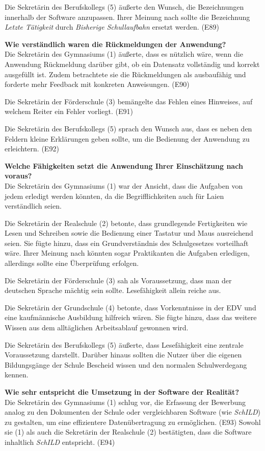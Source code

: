 Die Sekretärin des Berufskollegs (5) äußerte den Wunsch, die Bezeichnungen innerhalb der Software anzupassen. Ihrer Meinung nach sollte die Bezeichnung \textit{Letzte Tätigkeit} durch \textit{Bisherige Schullaufbahn} ersetzt werden. (E89)

\textbf{Wie verständlich waren die Rückmeldungen der Anwendung?}\\
Die Sekretärin des Gymnasiums (1) äußerte, dass es nützlich wäre, wenn die Anwendung Rückmeldung darüber gibt, ob ein Datensatz vollständig und korrekt ausgefüllt ist. Zudem betrachtete sie die Rückmeldungen als \glqq ausbaufähig\grqq{}  und forderte mehr Feedback mit konkreten Anweisungen. (E90)

Die Sekretärin der Förderschule (3) bemängelte das Fehlen eines Hinweises, auf welchem Reiter ein Fehler vorliegt. (E91)

Die Sekretärin des Berufskollegs (5) sprach den Wunsch aus, dass es neben den Feldern kleine Erklärungen geben sollte, um die Bedienung der Anwendung zu erleichtern. (E92)

\textbf{Welche Fähigkeiten setzt die Anwendung Ihrer Einschätzung nach voraus?}\\
Die Sekretärin des Gymnasiums (1) war der Ansicht, dass die Aufgaben von jedem erledigt werden könnten, da die Begrifflichkeiten auch für Laien verständlich seien.

Die Sekretärin der Realschule (2) betonte, dass grundlegende Fertigkeiten wie Lesen und Schreiben sowie die Bedienung einer Tastatur und Maus ausreichend seien. Sie fügte hinzu, dass ein Grundverständnis des Schulgesetzes vorteilhaft wäre. Ihrer Meinung nach könnten sogar Praktikanten die Aufgaben erledigen, allerdings sollte eine Überprüfung erfolgen.

Die Sekretärin der Förderschule (3) sah als Voraussetzung, dass man der deutschen Sprache mächtig sein sollte. Lesefähigkeit allein reiche aus.

Die Sekretärin der Grundschule (4) betonte, dass Vorkenntnisse in der EDV und eine kaufmännische Ausbildung hilfreich wären. Sie fügte hinzu, dass das weitere Wissen aus dem alltäglichen Arbeitsablauf gewonnen wird.

Die Sekretärin des Berufskollegs (5) äußerte, dass Lesefähigkeit eine zentrale Voraussetzung darstellt. Darüber hinaus sollten die Nutzer über die eigenen Bildungsgänge der Schule Bescheid wissen und den normalen Schulwerdegang kennen.

\textbf{Wie sehr entspricht die Umsetzung in der Software der Realität?}\\
Die Sekretärin des Gymnasiums (1) schlug vor, die Erfassung der Bewerbung analog zu den Dokumenten der Schule oder vergleichbaren Software (wie \textit{SchILD}) zu gestalten, um eine effizientere Datenübertragung zu ermöglichen. (E93) Sowohl sie (1) als auch die Sekretärin der Realschule (2) bestätigten, dass die Software inhaltlich \textit{SchILD} entspricht. (E94)


